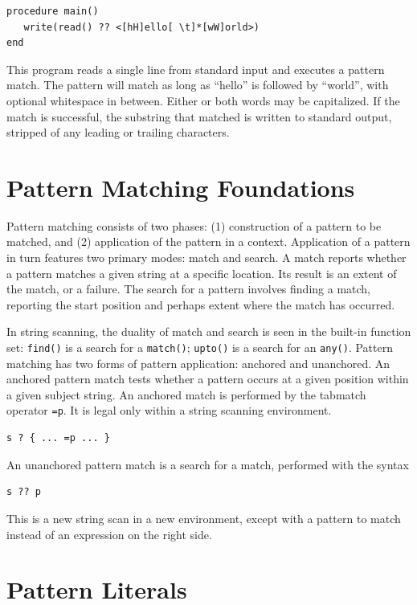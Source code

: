 \documentclass[letterpaper,12pt]{article}
\begin{document}
\begin{verbatim}
procedure main()
   write(read() ?? <[hH]ello[ \t]*[wW]orld>)
end
\end{verbatim}

This program reads a single line from standard input and executes a
pattern match. The pattern will match as long as ``hello'' is followed
by ``world'', with optional whitespace in between. Either or both
words may be capitalized. If the match is successful, the substring
that matched is written to standard output, stripped of any leading
or trailing characters.

\section{Pattern Matching Foundations}

Pattern matching consists of two phases: (1) construction of a
pattern to be matched, and (2) application of the pattern in a context.
Application of a pattern in turn features two primary modes: match
and search. A match reports whether a pattern matches a given string
at a specific location.  Its result is an extent of the match, or a
failure. The search for a pattern involves finding a match, reporting
the start position and perhaps extent where the match has occurred.

In string scanning, the duality of match and search is seen in the
built-in function set: {\tt find()} is a search for a {\tt match()};
{\tt upto()} is a search for an {\tt any()}. Pattern matching has
two forms of pattern
application: anchored and unanchored. An anchored pattern match tests
whether a pattern occurs at a given position within a given subject
string. An anchored match is performed by the tabmatch operator {\tt =p}.
It is legal only within a string scanning environment.

\begin{verbatim}
s ? { ... =p ... }
\end{verbatim}

An unanchored pattern match is a search for a match, performed with
the syntax

\begin{verbatim}
s ?? p
\end{verbatim}

\noindent This is a new string scan in a new environment, except with
a pattern to match instead of an expression on the right side.


\section{Pattern Literals}
\end{document}
